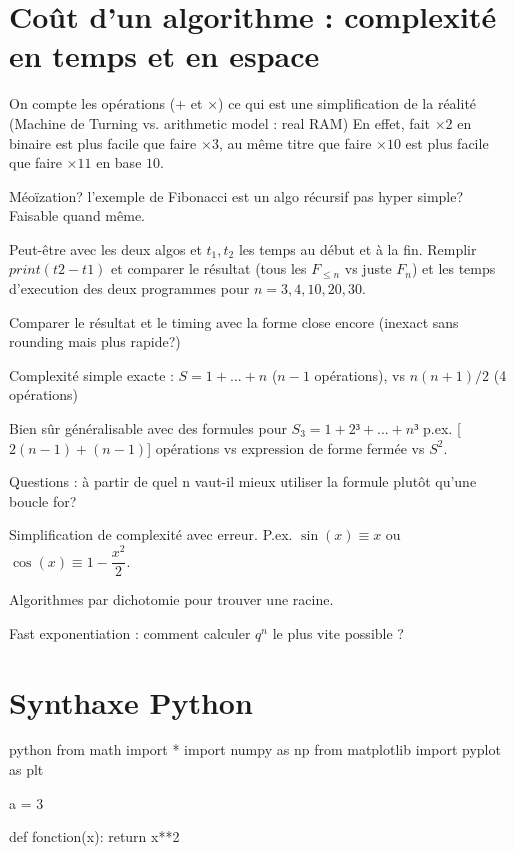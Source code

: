 \section{Coût d'un algorithme : complexité en temps et en espace}

On compte les opérations ($+$ et $\times$) ce qui est une simplification de la réalité (Machine de Turning vs. arithmetic model : real RAM)
En effet, fait $\times 2$ en binaire est plus facile que faire $\times3$, au même titre que faire $\times10$ est plus facile que faire $\times11$ en base $10$.

Méoïzation? l'exemple de Fibonacci est un algo récursif pas hyper simple? Faisable quand même.

Peut-être avec les deux algos et $t_1, t_2$ les temps au début et à la fin. Remplir $print(t2-t1)$ et comparer le résultat (tous les $F_{\leq n}$ vs juste $F_n$) et les temps d'execution des deux programmes pour $n=3, 4, 10, 20, 30$.

Comparer le résultat et le timing avec la forme close encore (inexact sans rounding mais plus rapide?)

Complexité simple exacte : $S = 1 + ... + n$ ($n-1$ opérations), vs $n(n+1)/2$ (4 opérations)

Bien sûr généralisable avec des formules pour $S_3 = 1+2³+...+n³$ p.ex. [$2(n-1) + (n-1)$] opérations vs expression de forme fermée vs $S^2$.

Questions : à partir de quel n vaut-il mieux utiliser la formule plutôt qu'une boucle for?

Simplification de complexité avec erreur. P.ex. $\sin(x) \equiv x$ ou $\cos(x) \equiv 1 - \dfrac{x^2}2$.

Algorithmes par dichotomie pour trouver une racine.

Fast exponentiation : comment calculer $q^n$ le plus vite possible ?


\section{Synthaxe Python}

\begin{mintedbox}{python}
from math import *
import numpy as np
from matplotlib import pyplot as plt

a = 3

def fonction(x):
	return x**2
\end{mintedbox}


